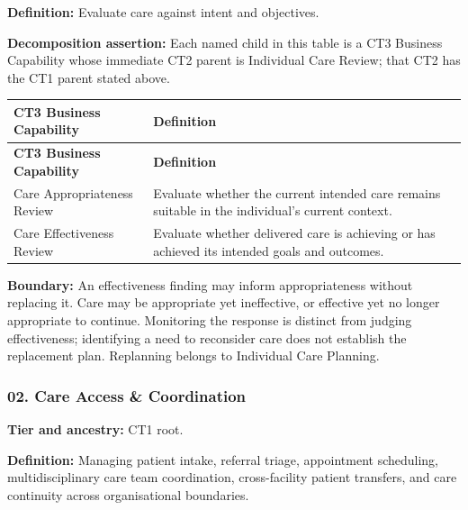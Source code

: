 \textbf{Definition:} Evaluate care against intent and objectives.

\label{rad:business:353}

\textbf{Decomposition assertion:} Each named child in this table is a CT3 Business Capability whose immediate CT2 parent is Individual Care Review; that CT2 has the CT1 parent stated above.

\label{rad:business:355}
\begingroup\small\setlength{\TableWidth}{\dimexpr\linewidth-4\tabcolsep-3\arrayrulewidth\relax}
\begin{longtable}{|>{\raggedright\arraybackslash}p{0.35\TableWidth}|>{\raggedright\arraybackslash}p{0.65\TableWidth}|}
\hline\rowcolor{TableHead}\textbf{CT3 Business Capability} & \textbf{Definition}\\\hline\endfirsthead
\hline\rowcolor{TableHead}\textbf{CT3 Business Capability} & \textbf{Definition}\\\hline\endhead
\hline\endfoot
Care Appropriateness Review & Evaluate whether the current intended care remains suitable in the individual’s current context.\\\hline
Care Effectiveness Review & Evaluate whether delivered care is achieving or has achieved its intended goals and outcomes.\\\hline
\end{longtable}\endgroup
{}\label{rad:business:360}

\textbf{Boundary:} An effectiveness finding may inform appropriateness without replacing it. Care may be appropriate yet ineffective, or effective yet no longer appropriate to continue. Monitoring the response is distinct from judging effectiveness; identifying a need to reconsider care does not establish the replacement plan. Replanning belongs to Individual Care Planning.

\label{rad:business:362}
\subsubsection*{02. Care Access \& Coordination}
\label{rad:business:364}

\textbf{Tier and ancestry:} CT1 root.

\label{rad:business:366}

\textbf{Definition:} Managing patient intake, referral triage, appointment scheduling, multidisciplinary care team coordination, cross-facility patient transfers, and care continuity across organisational boundaries.

